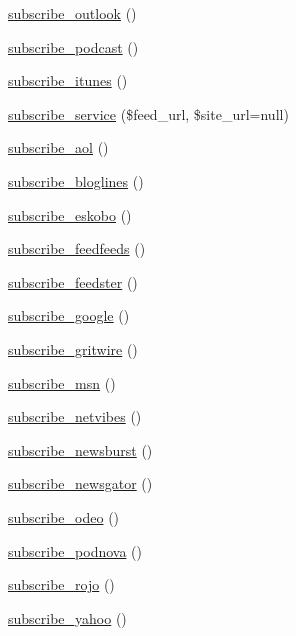 \begin{DoxyCompactItemize}
\item 
\hyperlink{class_simple_pie_a5f3080980b03dd9eb15248ad203c3816}{subscribe\-\_\-outlook} ()
\item 
\hyperlink{class_simple_pie_a2876af5ba6c8d3ee1ec43c01d94e8567}{subscribe\-\_\-podcast} ()
\item 
\hyperlink{class_simple_pie_a0d6c668b6a02927838e203fdaf079769}{subscribe\-\_\-itunes} ()
\item 
\hyperlink{class_simple_pie_ac89ab0448985561fe7198d5650ae048f}{subscribe\-\_\-service} (\$feed\-\_\-url, \$site\-\_\-url=null)
\item 
\hyperlink{class_simple_pie_a21d07d072ede92aa846f675b6585c238}{subscribe\-\_\-aol} ()
\item 
\hyperlink{class_simple_pie_a027d512ad8e1963823dc78c6be8e9a85}{subscribe\-\_\-bloglines} ()
\item 
\hyperlink{class_simple_pie_a4ed961bb890d409e1a9a6e789b6ec9e1}{subscribe\-\_\-eskobo} ()
\item 
\hyperlink{class_simple_pie_aa0a91de04cdb55c9225eabaa869544c7}{subscribe\-\_\-feedfeeds} ()
\item 
\hyperlink{class_simple_pie_a638c64921ff40a73adc2ac9bd688d154}{subscribe\-\_\-feedster} ()
\item 
\hyperlink{class_simple_pie_a20e400eae1d910a85be2bc812a39cd88}{subscribe\-\_\-google} ()
\item 
\hyperlink{class_simple_pie_a0e95082ee80c3a57aaf5f89bb38b0b65}{subscribe\-\_\-gritwire} ()
\item 
\hyperlink{class_simple_pie_a858a66aa0f7dea420c4444f05a05d3bf}{subscribe\-\_\-msn} ()
\item 
\hyperlink{class_simple_pie_a1bd8d78bbdc3bf992bb79452f2b6772d}{subscribe\-\_\-netvibes} ()
\item 
\hyperlink{class_simple_pie_a259f81edae49aedbb69f0cc91683c7dc}{subscribe\-\_\-newsburst} ()
\item 
\hyperlink{class_simple_pie_a11d096b7b050b2fbf6b7ff0026048cff}{subscribe\-\_\-newsgator} ()
\item 
\hyperlink{class_simple_pie_a1aa93c47a762a817beddf015032d6b40}{subscribe\-\_\-odeo} ()
\item 
\hyperlink{class_simple_pie_ad59af49bac0404e3c97aa30c5c343ee6}{subscribe\-\_\-podnova} ()
\item 
\hyperlink{class_simple_pie_a60b5c572cda6fb36841d3a166d49a15f}{subscribe\-\_\-rojo} ()
\item 
\hyperlink{class_simple_pie_ab92f7b9aeb241671b35457da1164343a}{subscribe\-\_\-yahoo} ()

\end{DoxyCompactItemize}

